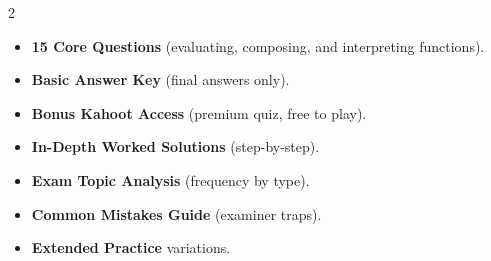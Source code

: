 \documentclass[11pt,a4paper]{article}
\newcommand{\FullReleaseDate}{April 30, 2026}
\begin{document}
\vspace{8pt}

\begin{multicols}{2}
  \begin{tcolorbox}[card, title=\sffamily\bfseries\textcolor{white}{\faHandPointDown\ TODAY (Simplified Version)}, colbacktitle=mainblue, boxed title style={sharp corners, boxrule=0pt}]
    \begin{itemize}[leftmargin=1.2em, itemsep=2pt]
      \item \small \textbf{15 Core Questions} (evaluating, composing, and interpreting functions).
      \item \small \textbf{Basic Answer Key} (final answers only).
      \item \small \textbf{Bonus Kahoot Access} (premium quiz, free to play).
    \end{itemize}
  \end{tcolorbox}

  \columnbreak

  \begin{tcolorbox}[card, title=\sffamily\bfseries\textcolor{white}{\faRocket\ ON \FullReleaseDate\ (Full Upgrade)}, colbacktitle=mainblue, boxed title style={sharp corners, boxrule=0pt}]
    \begin{itemize}[leftmargin=1.2em, itemsep=2pt]
      \item \small \textbf{In-Depth Worked Solutions} (step-by-step).
      \item \small \textbf{Exam Topic Analysis} (frequency by type).
      \item \small \textbf{Common Mistakes Guide} (examiner traps).
      \item \small \textbf{Extended Practice} variations.
    \end{itemize}
  \end{tcolorbox}
\end{multicols}
\end{document}

